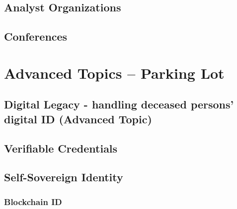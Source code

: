 \hypertarget{analyst-organizations}{%
\section{Analyst Organizations}\label{analyst-organizations}}

\hypertarget{conferences}{%
\section{Conferences}\label{conferences}}

\hypertarget{advanced-topics-parking-lot}{%
\chapter{Advanced Topics -- Parking
Lot}\label{advanced-topics-parking-lot}}

\hypertarget{digital-legacy---handling-deceased-persons-digital-id-advanced-topic}{%
\section{Digital Legacy - handling deceased persons' digital ID
(Advanced
Topic)}\label{digital-legacy---handling-deceased-persons-digital-id-advanced-topic}}

\hypertarget{verifiable-credentials}{%
\section{Verifiable Credentials}\label{verifiable-credentials}}

\hypertarget{self-sovereign-identity}{%
\section{Self-Sovereign Identity}\label{self-sovereign-identity}}

\hypertarget{blockchain-id}{%
\subsection{Blockchain ID}\label{blockchain-id}}
